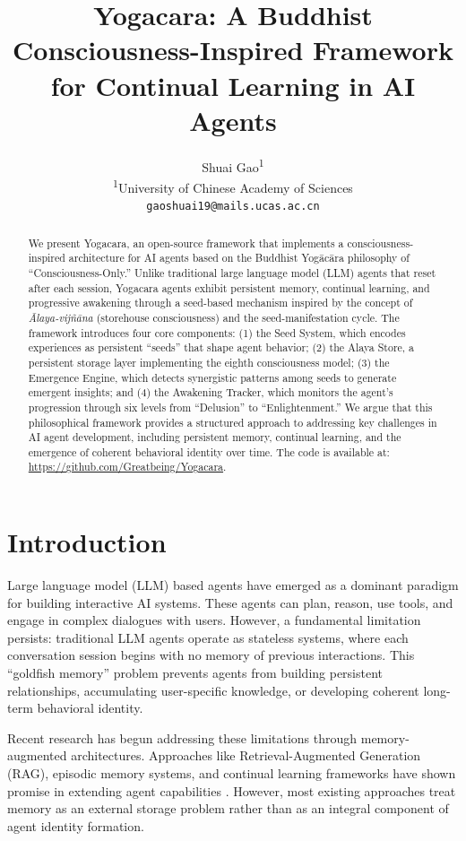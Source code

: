 \documentclass[11pt, a4paper]{article}
\title{Yogacara: A Buddhist Consciousness-Inspired Framework for Continual Learning in AI Agents}
\author{
    Shuai Gao\textsuperscript{1} \\
    \textsuperscript{1}University of Chinese Academy of Sciences \\
    \texttt{gaoshuai19@mails.ucas.ac.cn}
}
\begin{document}
\maketitle

\begin{abstract}
We present Yogacara, an open-source framework that implements a consciousness-inspired architecture for AI agents based on the Buddhist Yogācāra philosophy of ``Consciousness-Only.'' Unlike traditional large language model (LLM) agents that reset after each session, Yogacara agents exhibit persistent memory, continual learning, and progressive awakening through a seed-based mechanism inspired by the concept of \textit{Ālaya-vijñāna} (storehouse consciousness) and the seed-manifestation cycle. The framework introduces four core components: (1) the Seed System, which encodes experiences as persistent ``seeds'' that shape agent behavior; (2) the Alaya Store, a persistent storage layer implementing the eighth consciousness model; (3) the Emergence Engine, which detects synergistic patterns among seeds to generate emergent insights; and (4) the Awakening Tracker, which monitors the agent's progression through six levels from ``Delusion'' to ``Enlightenment.'' We argue that this philosophical framework provides a structured approach to addressing key challenges in AI agent development, including persistent memory, continual learning, and the emergence of coherent behavioral identity over time. The code is available at: \url{https://github.com/Greatbeing/Yogacara}.
\end{abstract}

\bigskip

\section{Introduction}

Large language model (LLM) based agents have emerged as a dominant paradigm for building interactive AI systems. These agents can plan, reason, use tools, and engage in complex dialogues with users. However, a fundamental limitation persists: traditional LLM agents operate as stateless systems, where each conversation session begins with no memory of previous interactions. This ``goldfish memory'' problem prevents agents from building persistent relationships, accumulating user-specific knowledge, or developing coherent long-term behavioral identity.

Recent research has begun addressing these limitations through memory-augmented architectures. Approaches like Retrieval-Augmented Generation (RAG), episodic memory systems, and continual learning frameworks have shown promise in extending agent capabilities \cite{Lewis2020, Zhang2025, Zheng2025}. However, most existing approaches treat memory as an external storage problem rather than as an integral component of agent identity formation.
\end{document}
